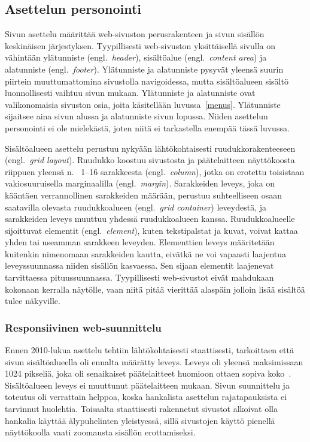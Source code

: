 \documentclass[finnish, 12pt, a4paper, elec, utf8, a-1b, online]{aaltothesis}
\begin{document}
\subsection{Asettelun personointi}\label{layout-personalization}

Sivun asettelu määrittää web-sivuston perusrakenteen ja sivun sisällön
keskinäisen järjestyksen. Tyypillisesti web-sivuston yksittäisellä sivulla on
vähintään ylätunniste (engl.\ \textit{header}), sisältöalue (engl.\
\textit{content area}) ja alatunniste (engl.\ \textit{footer}). Ylätunniste ja
alatunniste pysyvät yleensä suurin piirtein muuttumattomina sivustolla
navigoidessa, mutta sisältöalueen sisältö luonnollisesti vaihtuu sivun mukaan.
Ylätunniste ja alatunniste ovat valikonomaisia sivuston osia, joita käsitellään
luvussa~\ref{menus}. Ylätunniste sijaitsee aina sivun alussa ja alatunniste
sivun lopussa. Niiden asettelun personointi ei ole mielekästä, joten niitä ei
tarkastella enempää tässä luvussa.

Sisältöalueen asettelu perustuu nykyään lähtökohtaisesti ruudukkorakenteeseen
(engl.\ \textit{grid layout}). Ruudukko koostuu sivustosta ja päätelaitteen
näyttökoosta riippuen yleensä n. \ 1--16 sarakkeesta (engl.\ \textit{column}),
jotka on erotettu toisistaan vakiosuuruisella marginaalilla (engl.\
\textit{margin}). Sarakkeiden leveys, joka on kääntäen verrannollinen
sarakkeiden määrään, perustuu suhteelliseen osaan saatavilla olevasta
ruudukkoalueen (engl.\ \textit{grid container}) leveydestä, ja sarakkeiden
leveys muuttuu yhdessä ruudukkoalueen kanssa. Ruudukkoalueelle sijoittuvat
elementit (engl.\ \textit{element}), kuten tekstipalstat ja kuvat, voivat kattaa
yhden tai useamman sarakkeen leveyden. Elementtien leveys määritetään kuitenkin
nimenomaan sarakkeiden kautta, eivätkä ne voi vapaasti laajentua leveyssuunnassa
niiden sisällön kasvaessa. Sen sijaan elementit laajenevat tarvittaessa
pituussuunnassa. Tyypillisesti web-sivustot eivät mahdukaan kokonaan kerralla
näytölle, vaan niitä pitää vierittää alaspäin jolloin lisää sisältöä tulee
näkyville.

\subsubsection{Responsiivinen web-suunnittelu}\label{responsive-web-design}

Ennen 2010-lukua asettelu tehtiin lähtökohtaisesti staattisesti, tarkoittaen
että sivun sisältöalueella oli ennalta määrätty leveys. Leveys oli yleensä
maksimissaan 1024 pikseliä, joka oli senaikaiset päätelaitteet huomioon ottaen sopiva
koko~\cite{viite?}. Sisältöalueen leveys ei muuttunut päätelaitteen mukaan. Sivun suunnittelu
ja toteutus oli verrattain helppoa, koska hankalista asettelun rajatapauksista
ei tarvinnut huolehtia. Toisaalta staattisesti rakennetut sivustot alkoivat olla
hankalia käyttää älypuhelinten yleistyessä, sillä sivustojen käyttö pienellä
näyttökoolla vaati zoomausta sisällön erottamiseksi.
\end{document}
